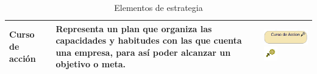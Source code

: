 \begin{table}[h!]
\begin{center}
\begin{tabular}{| l | p{6cm} | p{4cm} |}
			Curso de acción 
			& 
			Representa un plan que organiza las capacidades y habitudes con las que cuenta una empresa, para así poder alcanzar un objetivo o meta. 
			& 
			\vspace{0,2mm} \includegraphics[scale=0.48]{imgs/conceptos/estrategia/CursAcion.PNG}
			\includegraphics[scale=1.6]{imgs/conceptos/estrategia/imgCursAcion.PNG}
			\\ \hline
		\end{tabular}
		\caption{Elementos de estrategia}
		\label{tab:EstrategyConcepts}
	\end{center}
\end{table}
